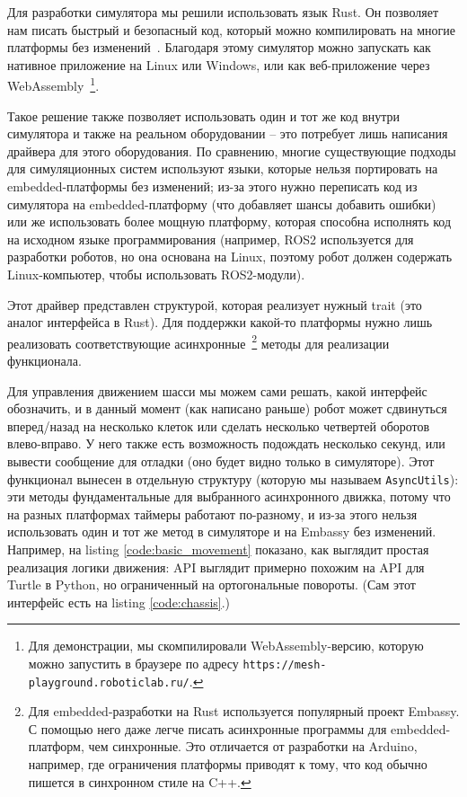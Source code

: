 \documentclass[%
]{article}
\begin{document}
Для разработки симулятора мы решили использовать язык Rust.
Он позволяет нам писать быстрый и безопасный код,
который можно компилировать на многие платформы без изменений~\cite{10.1145/2663171.2663188}.
Благодаря этому симулятор можно запускать как нативное приложение на Linux или Windows,
или как веб-приложение через WebAssembly~\footnote{Для демонстрации,
мы скомпилировали WebAssembly-версию, которую можно запустить в браузере по адресу \texttt{https://mesh-playground.roboticlab.ru/}.}.

Такое решение также позволяет использовать один и тот же код внутри симулятора
и также на реальном оборудовании --
это потребует лишь написания драйвера для этого оборудования.
По сравнению, многие существующие подходы
для симуляционных систем
используют языки,
которые нельзя портировать на embedded-платформы без изменений;
из-за этого нужно переписать код из симулятора на embedded-платформу
(что добавляет шансы добавить ошибки)
или же использовать более мощную платформу, которая способна
исполнять код на исходном языке программирования
(например, ROS2 используется для разработки роботов,
но она основана на Linux, поэтому робот должен содержать
Linux-компьютер, чтобы использовать ROS2-модули).

Этот драйвер представлен структурой, которая реализует нужный trait (это аналог интерфейса в Rust).
Для поддержки какой-то платформы нужно лишь реализовать соответствующие асинхронные~\footnote{Для embedded-разработки
на Rust используется популярный проект Embassy. С помощью него даже легче писать асинхронные программы
для embedded-платформ, чем синхронные. Это отличается от разработки на Arduino, например,
где ограничения платформы приводят к тому,
что код обычно пишется в синхронном стиле на C++.}
 методы для реализации функционала.

Для управления движением шасси мы можем сами решать, какой интерфейс обозначить,
и в данный момент (как написано раньше)
робот может сдвинуться вперед/назад на несколько клеток или сделать несколько четвертей оборотов
влево-вправо.
У него также есть возможность подождать несколько секунд,
или вывести сообщение для отладки
(оно будет видно только в симуляторе).
Этот функционал вынесен в отдельную структуру
(которую мы называем \texttt{AsyncUtils}):
эти методы фундаментальные для выбранного асинхронного движка,
потому что на разных платформах таймеры работают по-разному,
и из-за этого нельзя использовать один и тот же метод 
в симуляторе и на Embassy без изменений.
Например, на listing \ref{code:basic_movement} показано,
как выглядит простая реализация логики движения:
API выглядит примерно похожим на API для Turtle в Python,
но ограниченный на ортогональные повороты.
(Сам этот интерфейс есть на listing \ref{code:chassis}.)
\end{document}
